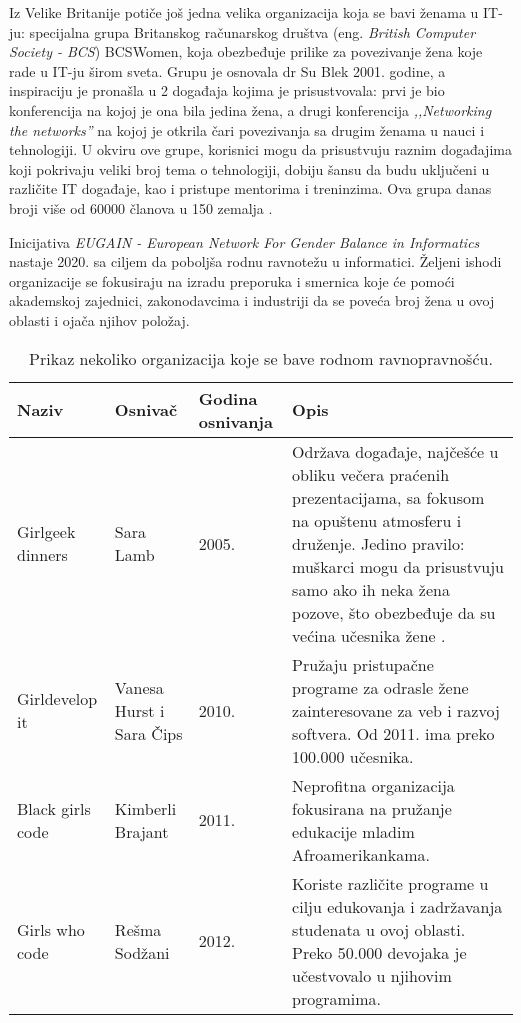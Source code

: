 Iz Velike Britanije potiče još jedna velika organizacija koja se bavi ženama u IT-ju: specijalna grupa Britanskog računarskog društva (eng. \emph{British Computer Society - BCS}) BCSWomen, koja obezbeđuje prilike za povezivanje žena koje rade u IT-ju širom sveta. Grupu je osnovala dr Su Blek 2001. godine, a inspiraciju je pronašla u 2 događaja kojima je prisustvovala: prvi je bio konferencija na kojoj je ona bila jedina žena, a drugi konferencija \emph{,,Networking the networks''} na kojoj je otkrila čari povezivanja sa drugim ženama u nauci i tehnologiji. U okviru ove grupe, korisnici mogu da prisustvuju raznim događajima koji pokrivaju veliki broj tema o tehnologiji, dobiju šansu da budu uključeni u različite IT događaje, kao i pristupe mentorima i treninzima. Ova grupa danas broji više od 60000 članova u 150 zemalja \cite{bcswomen}.

Inicijativa \emph{EUGAIN - European Network For Gender Balance in Informatics} nastaje 2020. sa ciljem da poboljša rodnu ravnotežu u informatici. Željeni ishodi organizacije se fokusiraju na izradu preporuka i smernica koje će pomoći akademskoj zajednici, zakonodavcima i industriji da se poveća broj žena u ovoj oblasti i ojača njihov položaj.

\begin{table}[h!]
\begin{center}
\begin{tabular}{|p{1.12cm}|p{1.2cm}|p{1.45cm}|p{7.8cm}|} \hline
Naziv& Osnivač& Godina osnivanja& Opis\\ \hline
Girl\newline{}geek dinners & Sara Lamb & 2005. & Održava događaje, najčešće u obliku večera praćenih prezentacijama, sa fokusom na opuštenu atmosferu i druženje. Jedino pravilo: muškarci mogu da prisustvuju samo ako ih neka žena pozove, što obezbeđuje da su većina učesnika žene \cite{girlgeek}. \\ \hline
Girl\newline{}develop it & Vanesa Hurst i Sara Čips & 2010. & Pružaju pristupačne programe za odrasle žene zainteresovane za veb i razvoj softvera. Od 2011. ima preko 100.000 učesnika.\\ \hline
Black girls code & Kimberli Brajant & 2011. & Neprofitna organizacija fokusirana na pružanje edukacije mladim Afroamerikankama.\\ \hline
Girls who code & Rešma Sodžani & 2012. & Koriste različite programe u cilju edukovanja i zadržavanja studenata u ovoj oblasti. Preko 50.000 devojaka je učestvovalo u njihovim programima. \\ \hline
\end{tabular}
\caption{Prikaz nekoliko organizacija koje se bave rodnom ravnopravnošću.}
\label{tab:rr}
\end{center}
\end{table}